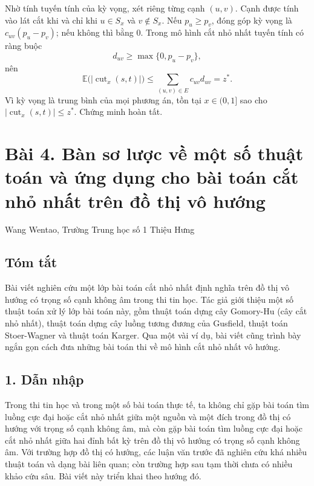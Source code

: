 \documentclass[11pt]{article}
\begin{document}
Nhờ tính tuyến tính của kỳ vọng, xét riêng từng cạnh \((u,v)\). Cạnh được
tính vào lát cắt khi và chỉ khi \(u\in S_x\) và \(v\notin S_x\). Nếu
\(p_u\ge p_v\), đóng góp kỳ vọng là \(c_{uv}(p_u-p_v)\); nếu không thì bằng
\(0\). Trong mô hình cắt nhỏ nhất tuyến tính có ràng buộc
\[
  d_{uv}\ge \max\{0,p_u-p_v\},
\]
nên
\[
  \mathbb{E}\bigl(|\operatorname{cut}_x(s,t)|\bigr)
  \le \sum_{(u,v)\in E}c_{uv}d_{uv}=z^*.
\]
Vì kỳ vọng là trung bình của mọi phương án, tồn tại \(x\in(0,1]\) sao cho
\(|\operatorname{cut}_x(s,t)|\le z^*\). Chứng minh hoàn tất.

\section*{Bài 4. Bàn sơ lược về một số thuật toán và ứng dụng cho bài toán cắt nhỏ nhất trên đồ thị vô hướng}

\begin{center}
Wang Wentao, Trường Trung học số 1 Thiệu Hưng
\end{center}

\subsection*{Tóm tắt}

Bài viết nghiên cứu một lớp bài toán cắt nhỏ nhất định nghĩa trên đồ thị vô
hướng có trọng số cạnh không âm trong thi tin học. Tác giả giới thiệu một số
thuật toán xử lý lớp bài toán này, gồm thuật toán dựng cây Gomory-Hu (cây cắt
nhỏ nhất), thuật toán dựng cây luồng tương đương của Gusfield, thuật toán
Stoer-Wagner và thuật toán Karger. Qua một vài ví dụ, bài viết cũng trình bày
ngắn gọn cách đưa những bài toán thi về mô hình cắt nhỏ nhất vô hướng.

\subsection*{1. Dẫn nhập}

Trong thi tin học và trong một số bài toán thực tế, ta không chỉ gặp bài toán
tìm luồng cực đại hoặc cắt nhỏ nhất giữa một nguồn và một đích trong đồ thị có
hướng với trọng số cạnh không âm, mà còn gặp bài toán tìm luồng cực đại hoặc
cắt nhỏ nhất giữa hai đỉnh bất kỳ trên đồ thị vô hướng có trọng số cạnh không
âm. Với trường hợp đồ thị có hướng, các luận văn trước đã nghiên cứu khá
nhiều thuật toán và dạng bài liên quan; còn trường hợp sau tạm thời chưa có
nhiều khảo cứu sâu. Bài viết này triển khai theo hướng đó.
\end{document}
